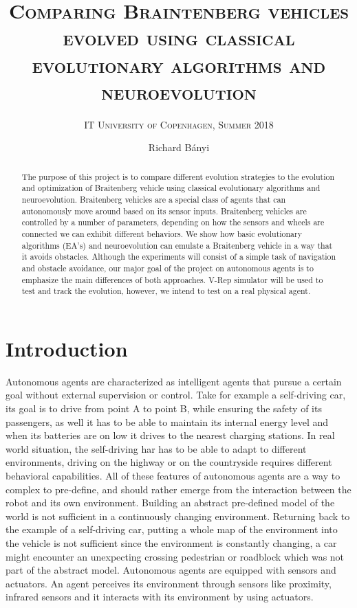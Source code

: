 \documentclass[format=acmsmall, review=false, screen=true]{acmart}
\author{Richard Bányi}
\title{\textsc{Comparing Braintenberg vehicles evolved using classical evolutionary algorithms and neuroevolution}}
\subtitle{\textsc{IT University of Copenhagen, Summer 2018}}
\begin{document}
\begin{abstract}
The purpose of this project is to compare different evolution strategies to the evolution and optimization of Braitenberg vehicle using classical evolutionary algorithms and neuroevolution. Braitenberg vehicles are a special class of agents that can autonomously move around based on its sensor inputs. Braitenberg vehicles are controlled by a number of parameters, depending on how the sensors and wheels are connected we can exhibit different behaviors. We show how basic evolutionary algorithms (EA’s) and neuroevolution can emulate a Braitenberg vehicle in a way that it avoids obstacles. Although the experiments will consist of a simple task of navigation and obstacle avoidance, our major goal of the project on autonomous agents is to emphasize the main differences of both approaches. V-Rep simulator will be used to test and track the evolution, however, we intend to test on a real physical agent.
	\end{abstract}
\maketitle


\section{Introduction}

Autonomous agents are characterized as intelligent agents that pursue a certain goal without external supervision or control. Take for example a self-driving car\cite{eberhard200621}, its goal is to drive from point A to point B, while ensuring the safety of its passengers, as well it has to be able to maintain its internal energy level and when its batteries are on low it drives to the nearest charging stations. In real world situation, the self-driving har has to be able to adapt to different environments, driving on the highway or on the countryside requires different behavioral capabilities. All of these features of autonomous agents are a way to complex to pre-define, and should rather emerge from the interaction between the robot and its own environment. Building an abstract pre-defined model of the world is not sufficient in a continuously changing environment. Returning back to the example of a self-driving car, putting a whole map of the environment into the vehicle is not sufficient since the environment is constantly changing, a car might encounter an unexpecting crossing pedestrian or roadblock which was not part of the abstract model. Autonomous agents are equipped with sensors and actuators. An agent perceives its environment through sensors like proximity, infrared sensors and it interacts with its environment by using actuators. 
\end{document}
